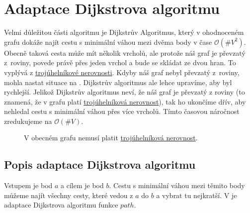 \section{Adaptace Dijkstrova algoritmu}
\label{sec:dijkstra}

Velmi důležitou části algoritmu je Dijkstrův Algoritmus, který v ohodnoceném grafu dokáže najít cestu s minimální váhou mezi dvěma body v čase $ \mathcal{O}(\#V^2)$. \autocite{benlFormalCorrectnessProofs1999} Obecně taková cesta může mít několik vrcholů, ale protože náš graf je převzatý z~roviny, povede právě přes jeden vrchol a bude se skládat ze dvou hran. To vyplývá z \hyperref[tvrzeni:trojuhelnikova_nerovnost]{trojúhelníkové nerovnosti}. Kdyby náš graf nebyl převzatý z~roviny, mohla nastat situace na . Dijkstrův algoritmus ale lehce upravíme, aby byl rychlejší. Jelikož Dijkstrův algoritmus neví, že náš graf je převzatý z roviny (to znamená, že v grafu platí \hyperref[tvrzeni:trojuhelnikova_nerovnost]{trojúhelníková nerovnost}), tak ho ukončíme dřív, aby nehledal cestu s minimální váhou přes více vrcholů. Tímto časovou náročnost zredukujeme na $ \mathcal{O}(\#V)$.

\begin{figure}[H]
  \centering
  \caption{V obecném grafu nemusí platit \hyperref[tvrzeni:trojuhelnikova_nerovnost]{trojúhelníková nerovnost}.}
  \label{obr:troj_ner_graf}
\end{figure}

\subsection{Popis adaptace Dijkstrova algoritmu}
\label{subsec:dijkstra_adaptace}
  Vstupem je bod $a$ a cílem je bod $b$. Cestu s minimální váhou mezi těmito body můžeme najít všechny cesty, které vedou z $a$ do $b$ a vybrat tu nejkratší. V  je adaptace Dijkstrova algoritmu funkce $path$.

